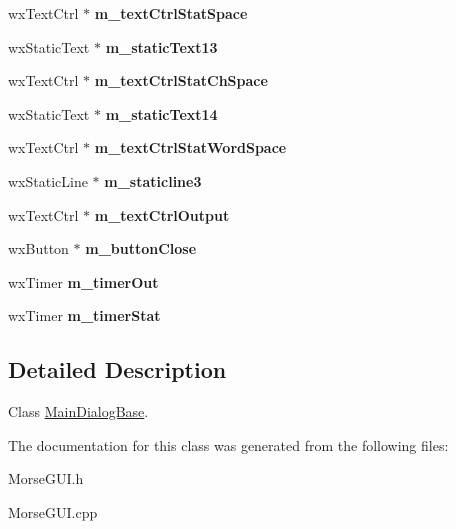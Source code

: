 \begin{DoxyCompactItemize}
wx\+Text\+Ctrl $\ast$ {\bfseries m\+\_\+text\+Ctrl\+Stat\+Space}
\item 
\mbox{\label{classMainDialogBase_a88c0890537cff8672284776ef1375485}} 
wx\+Static\+Text $\ast$ {\bfseries m\+\_\+static\+Text13}
\item 
\mbox{\label{classMainDialogBase_a6cfe514859b1a8a45b7945550e7b3ee6}} 
wx\+Text\+Ctrl $\ast$ {\bfseries m\+\_\+text\+Ctrl\+Stat\+Ch\+Space}
\item 
\mbox{\label{classMainDialogBase_a91d797f7493de12b1072572c8cd01197}} 
wx\+Static\+Text $\ast$ {\bfseries m\+\_\+static\+Text14}
\item 
\mbox{\label{classMainDialogBase_ad89261c13d806f0de50c40359dcaf292}} 
wx\+Text\+Ctrl $\ast$ {\bfseries m\+\_\+text\+Ctrl\+Stat\+Word\+Space}
\item 
\mbox{\label{classMainDialogBase_a638f225b3c0e165f2b40b9fe9ddfee95}} 
wx\+Static\+Line $\ast$ {\bfseries m\+\_\+staticline3}
\item 
\mbox{\label{classMainDialogBase_ac44c9a46fc50a9ad4cd37dbc2235b69e}} 
wx\+Text\+Ctrl $\ast$ {\bfseries m\+\_\+text\+Ctrl\+Output}
\item 
\mbox{\label{classMainDialogBase_affa90d30ed92cf8b122b16451693ff98}} 
wx\+Button $\ast$ {\bfseries m\+\_\+button\+Close}
\item 
\mbox{\label{classMainDialogBase_a9cbe518b2cd7c32fd11e91937cc09062}} 
wx\+Timer {\bfseries m\+\_\+timer\+Out}
\item 
\mbox{\label{classMainDialogBase_a8f6aa440def039635fed532a8674dbde}} 
wx\+Timer {\bfseries m\+\_\+timer\+Stat}
\end{DoxyCompactItemize}


\subsection{Detailed Description}
Class \hyperlink{classMainDialogBase}{Main\+Dialog\+Base}. 

The documentation for this class was generated from the following files\+:\begin{DoxyCompactItemize}
\item 
Morse\+G\+U\+I.\+h\item 
Morse\+G\+U\+I.\+cpp\end{DoxyCompactItemize}

